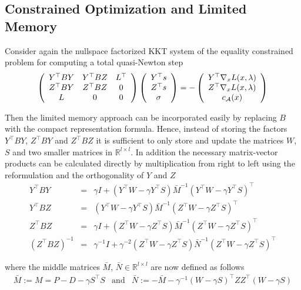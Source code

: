 \documentclass{svmult}
\begin{document}
\clearpage
\subsection{Constrained Optimization and Limited Memory}
\noindent Consider again the nullspace factorized KKT system of the equality constrained problem  for computing a total quasi-Newton step  
\begin{equation*}
	\left( \begin{array}{c c c} Y^{\top}BY & Y^{\top}BZ &L^{\top}\\
					Z^{\top}BY & Z^{\top}BZ &0\\
				L&0&0 \end{array}\right)
		\left( \begin{array}{c} Y^{\top}s \\ Z^{\top}s \\ \sigma \end{array}\right)
		= - \left( \begin{array}{c} Y^{\top}\nabla_x L(x,\lambda) \\ Z^{\top}\nabla_x L(x,\lambda) \\c_{\mathcal{A}}(x) \end{array}\right)
\end{equation*}

\noindent Then the limited memory approach can be incorporated easily by replacing $B$ with the compact representation formula.
Hence, instead of storing the factors $Y^{\top}BY$, $Z^{\top}BY$ and $Z^{\top}BZ$ it is sufficient to only store and update the matrices $W$, $S$ and two smaller matrices in $\mathbb{R}^{l\times l}$. In addition the necessary matrix-vector products can be calculated directly by multiplication from right to left using the reformulation and the orthogonality of $Y$ and $Z$
\begin{eqnarray*}
		Y^{\top}BY&=&\gamma I +(Y^{\top}W-\gamma Y^{\top}S)\bar{M}^{-1}(Y^{\top}W-\gamma Y^{\top}S)^{\top}\\
		Y^{\top}BZ&=&(Y^{\top}W-\gamma Y^{\top}S)\bar{M}^{-1}(Z^{\top}W-\gamma Z^{\top}S)^{\top}\\
		Z^{\top}BZ&=&\gamma I +(Z^{\top}W-\gamma Z^{\top}S)\bar{M}^{-1}(Z^{\top}W-\gamma Z^{\top}S)^{\top}\\
		(Z^{\top}BZ)^{-1}&=&\gamma^{-1} I +\gamma^{-2}(Z^{\top}W-\gamma Z^{\top}S) \bar{N}^{-1}(Z^{\top}W-\gamma Z^{\top}S)^{\top}  
\end{eqnarray*}

\noindent where the middle matrices $\bar{M}$, $\bar{N} \in \mathbb{R}^{l\times l}$ are now defined as follows
\begin{eqnarray*}
		\bar{M}:=M=P-D-\gamma S^{\top}S & \mbox{and} & \bar{N}:=-\bar{M} -\gamma^{-1} (W-\gamma S)^{\top}ZZ^{\top}(W-\gamma S)
\end{eqnarray*}
\end{document}
